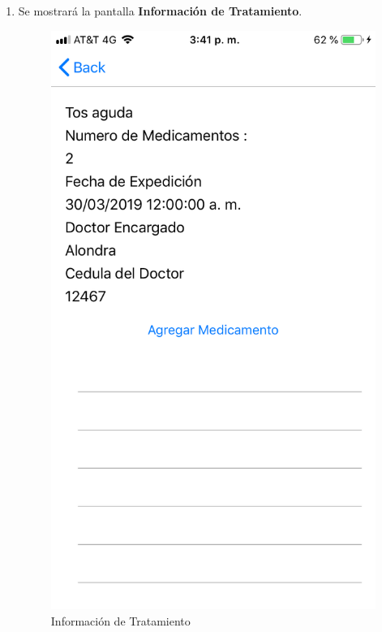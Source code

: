 \begin{enumerate}
	\item Se mostrará la pantalla \textbf{Información de Tratamiento}. 
	\newpage
	
	\begin{figure}[!htbp]			
		\hypertarget{fig:infoTratamiento2}{\hspace{1pt}}
		\begin{center}
			\includegraphics[height=0.4\textheight]{Paciente/AgregarMedicamento/images/infoTratamiento}
			\caption{Información de Tratamiento}
			\label{fig:infoTratamiento2}
		\end{center}
	\end{figure}


\end{enumerate}
